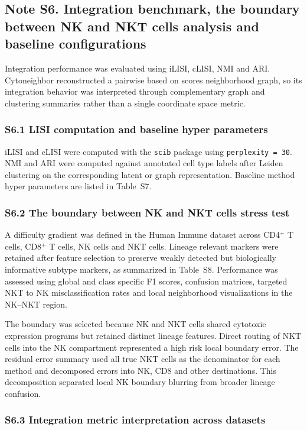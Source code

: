 \documentclass[11pt]{article}
\begin{document}
\subsection*{Note S6. Integration benchmark, the boundary between NK and NKT cells analysis and baseline configurations}

Integration performance was evaluated using iLISI, cLISI, NMI and ARI. Cytoneighbor reconstructed a pairwise based on scores neighborhood graph, so its integration behavior was interpreted through complementary graph and clustering summaries rather than a single coordinate space metric.

\subsubsection*{S6.1 LISI computation and baseline hyper parameters}

iLISI and cLISI were computed with the \texttt{scib} package using \texttt{perplexity = 30}. NMI and ARI were computed against annotated cell type labels after Leiden clustering on the corresponding latent or graph representation. Baseline method hyper parameters are listed in Table~S7.

\subsubsection*{S6.2 The boundary between NK and NKT cells stress test}

A difficulty gradient was defined in the Human Immune dataset across CD4\(^{+}\) T cells, CD8\(^{+}\) T cells, NK cells and NKT cells. Lineage relevant markers were retained after feature selection to preserve weakly detected but biologically informative subtype markers, as summarized in Table~S8. Performance was assessed using global and class specific F1 scores, confusion matrices, targeted NKT to NK misclassification rates and local neighborhood visualizations in the NK--NKT region.

The boundary was selected because NK and NKT cells shared cytotoxic expression programs but retained distinct lineage features. Direct routing of NKT cells into the NK compartment represented a high risk local boundary error. The residual error summary used all true NKT cells as the denominator for each method and decomposed errors into NK, CD8 and other destinations. This decomposition separated local NK boundary blurring from broader lineage confusion.

\subsubsection*{S6.3 Integration metric interpretation across datasets}
\end{document}
